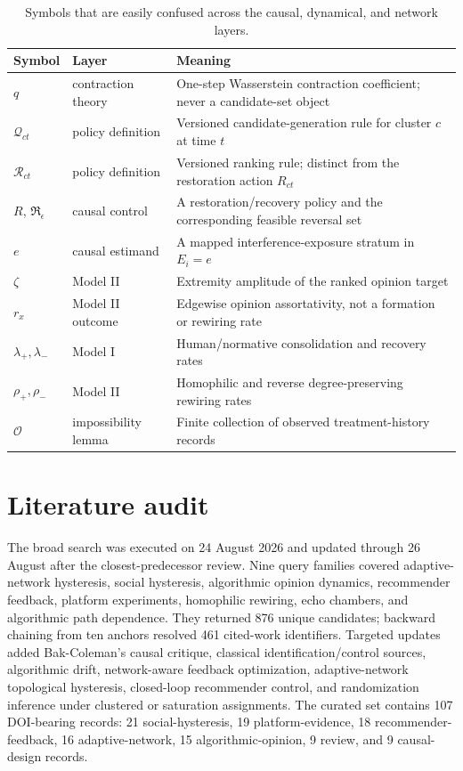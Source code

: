 \documentclass[10pt,a4paper]{article}
\begin{document}
\begin{appendices}
\begin{table}[!htbp]
\centering
\caption{Symbols that are easily confused across the causal, dynamical, and network layers.}
\label{tab:notation-ledger}
\small
\begin{tabularx}{\textwidth}{|p{2.0cm}|p{3.4cm}|Y|}
\hline
\textbf{Symbol} & \textbf{Layer} & \textbf{Meaning}\\
\hline
$q$ & contraction theory & One-step Wasserstein contraction coefficient; never a candidate-set object\\
\hline
$\mathcal Q_{ct}$ & policy definition & Versioned candidate-generation rule for cluster $c$ at time $t$\\
\hline
$\mathcal R_{ct}$ & policy definition & Versioned ranking rule; distinct from the restoration action $R_{ct}$\\
\hline
$R$, $\mathfrak R_\epsilon$ & causal control & A restoration/recovery policy and the corresponding feasible reversal set\\
\hline
$e$ & causal estimand & A mapped interference-exposure stratum in $E_i=e$\\
\hline
$\zeta$ & Model II & Extremity amplitude of the ranked opinion target\\
\hline
$r_x$ & Model II outcome & Edgewise opinion assortativity, not a formation or rewiring rate\\
\hline
$\lambda_+,\lambda_-$ & Model I & Human/normative consolidation and recovery rates\\
\hline
$\rho_+,\rho_-$ & Model II & Homophilic and reverse degree-preserving rewiring rates\\
\hline
$\mathcal O$ & impossibility lemma & Finite collection of observed treatment-history records\\
\hline
\end{tabularx}
\end{table}

\section{Literature audit}

The broad search was executed on 24 August 2026 and updated through 26 August after the closest-predecessor review. Nine query families covered adaptive-network hysteresis, social hysteresis, algorithmic opinion dynamics, recommender feedback, platform experiments, homophilic rewiring, echo chambers, and algorithmic path dependence. They returned 876 unique candidates; backward chaining from ten anchors resolved 461 cited-work identifiers. Targeted updates added Bak-Coleman's causal critique, classical identification/control sources, algorithmic drift, network-aware feedback optimization, adaptive-network topological hysteresis, closed-loop recommender control, and randomization inference under clustered or saturation assignments. The curated set contains 107 DOI-bearing records: 21 social-hysteresis, 19 platform-evidence, 18 recommender-feedback, 16 adaptive-network, 15 algorithmic-opinion, 9 review, and 9 causal-design records.


\end{appendices}
\end{document}
